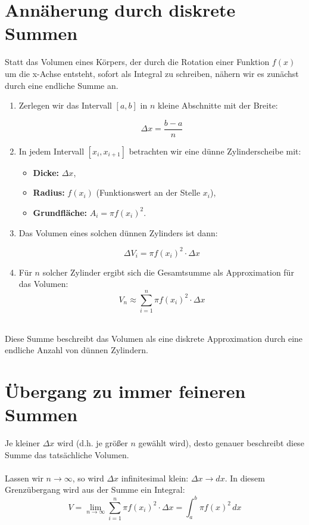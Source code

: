 \documentclass[a4paper,final]{report}
\begin{document}
\section{Annäherung durch diskrete Summen}

Statt das Volumen eines Körpers, der durch die Rotation einer Funktion \( f(x) \) um die x-Achse entsteht, sofort als Integral zu schreiben, nähern wir es zunächst durch eine endliche Summe an.

\begin{enumerate}
    \item Zerlegen wir das Intervall \( [a, b] \) in \( n \) kleine Abschnitte mit der Breite:
    
    \[
    \Delta x = \frac{b-a}{n}
    \]
    
    \item In jedem Intervall \( [x_i, x_{i+1}] \) betrachten wir eine dünne Zylinderscheibe mit:
    \begin{itemize}
        \item \textbf{Dicke:} \( \Delta x \),
        \item \textbf{Radius:} \( f(x_i) \) (Funktionswert an der Stelle \( x_i \)),
        \item \textbf{Grundfläche:} \( A_i = \pi f(x_i)^2 \).
    \end{itemize}
    
    \item Das Volumen eines solchen dünnen Zylinders ist dann:
    
    \[
    \Delta V_i = \pi f(x_i)^2 \cdot \Delta x
    \]
    
    \item Für \( n \) solcher Zylinder ergibt sich die Gesamtsumme als Approximation für das Volumen:
\\    
    \[
    V_n \approx \sum_{i=1}^{n} \pi f(x_i)^2 \cdot \Delta x
    \]
\\   
\end{enumerate}
Diese Summe beschreibt das Volumen als eine diskrete Approximation durch eine endliche Anzahl von dünnen Zylindern.
\\
\section{Übergang zu immer feineren Summen}

Je kleiner \( \Delta x \) wird (d.h. je größer \( n \) gewählt wird), desto genauer beschreibt diese Summe das tatsächliche Volumen. 
\\
\\
Lassen wir \( n \to \infty \), so wird \( \Delta x \) infinitesimal klein: \( \Delta x \to dx \). In diesem Grenzübergang wird aus der Summe ein Integral:
\\
\[
V = \lim_{n \to \infty} \sum_{i=1}^{n} \pi f(x_i)^2 \cdot \Delta x = \int_a^b \pi f(x)^2 \, dx
\]
\cite{frassek_rotationskoerper}
\cite{hans_riegel_numerische_integration}
\end{document}
